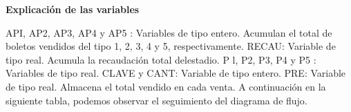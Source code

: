 \documentclass[11pt]{amsart}
\begin{document}
\noindent\textbf{Explicación de las variables}
\newline

\noindent API, AP2, AP3, AP4 y AP5 : Variables de tipo entero. Acumulan el total de boletos
vendidos del tipo 1, 2, 3, 4 y 5, respectivamente.
\newline
\noindent RECAU: Variable de tipo real. Acumula la recaudación total delestadio.
\newline
\noindent P l, P2, P3, P4 y P5 : Variables de tipo real.
\newline
\noindent CLAVE y CANT: Variable de tipo entero.
\newline
\noindent PRE: Variable de tipo real. Almacena el total vendido en cada venta.
\newline
\noindent  A continuación en la siguiente tabla, podemos observar el seguimiento del
diagrama de flujo.
\newline
\end{document}
